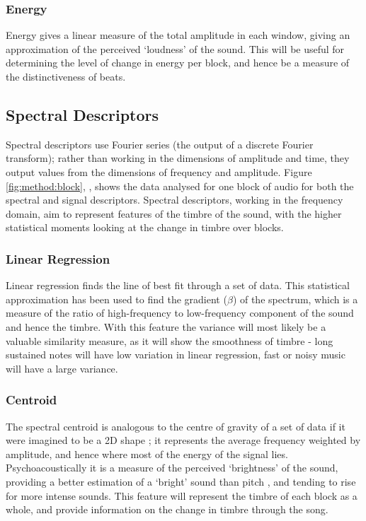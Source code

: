 \subsubsection{Energy}

Energy gives a linear measure of the total amplitude in each window, giving an approximation of the perceived `loudness' of the sound. This will be useful for determining the level of change in energy per block, and hence be a measure of the distinctiveness of beats.
\subsection{Spectral Descriptors}
Spectral descriptors use Fourier series (the output of a discrete Fourier transform); rather than working in the dimensions of amplitude and time, they output values from the dimensions of frequency and amplitude. Figure \ref{fig:method:block}, , shows the data analysed for one block of audio for both the spectral and signal descriptors. Spectral descriptors, working in the frequency domain, aim to represent features of the timbre of the sound, with the higher statistical moments looking at the change in timbre over blocks.
\subsubsection{Linear Regression}

Linear regression finds the line of best fit through a set of data. This statistical approximation has been used to find the gradient ($\beta$) of the spectrum, which is a measure of the ratio of high-frequency to low-frequency component of the sound and hence the timbre. With this feature the variance will most likely be a valuable similarity measure, as it will show the smoothness of timbre - long sustained notes will have low variation in linear regression, fast or noisy music will have a large variance.
\subsubsection{Centroid}

The spectral centroid is analogous to the centre of gravity of a set of data if it were imagined to be a 2D shape \citep{Park2004}; it represents the average frequency weighted by amplitude, and hence where most of the energy of the signal lies. Psychoacoustically it is a measure of the perceived `brightness' of the sound, providing a better estimation of a `bright' sound than pitch \citep{Schubert2004}, and tending to rise for more intense sounds. This feature will represent the timbre of each block as a whole, and provide information on the change in timbre through the song.

